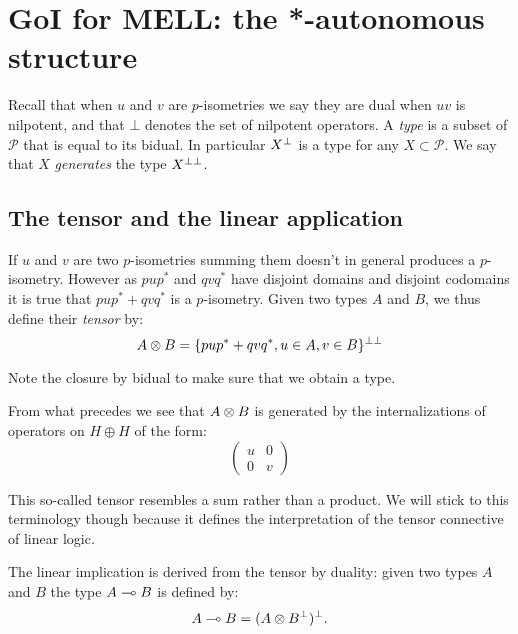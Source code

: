 \section{GoI for MELL: the *-autonomous structure}\label{goi-for-mell-the--autonomous-structure}

Recall that when \(u\) and \(v\) are \(p\)-isometries we say they are
dual when \(uv\) is nilpotent, and that \(\bot\) denotes the set of
nilpotent operators. A \emph{type} is a subset of \(\mathcal{P}\) that
is equal to its bidual. In particular \(X^\bot\) is a type for any
\(X\subset\mathcal{P}\). We say that \(X\) \emph{generates} the type
\(X^{\bot\bot}\).

\subsection{The tensor and the linear application}\label{the-tensor-and-the-linear-application}

If \(u\) and \(v\) are two \(p\)-isometries summing them doesn't in
general produces a \(p\)-isometry. However as \(pup^*\) and \(qvq^*\)
have disjoint domains and disjoint codomains it is true that
\(pup^* + qvq^*\) is a \(p\)-isometry. Given two types \(A\) and \(B\),
we thus define their \emph{tensor} by:
\begin{equation*}
A\otimes B = \{pup^* + qvq^*, u\in A, v\in B\}^{\bot\bot}
\end{equation*}

Note the closure by bidual to make sure that we obtain a type.

From what precedes we see that \(A\otimes B\) is generated by the
internalizations of operators on \(H\oplus H\) of the form:
\begin{equation*}
\begin{pmatrix}
  u & 0 \\
  0 & v
\end{pmatrix}
\end{equation*}

\begin{remark}
This so-called tensor resembles a sum rather than a product. We will stick to this terminology though because it defines the interpretation of the tensor connective of linear logic.
\end{remark}

The linear implication is derived from the tensor by duality: given two
types \(A\) and \(B\) the type \(A\multimap B\) is defined by:
\begin{equation*}
A\multimap B = (A\otimes B^\bot)^\bot.
\end{equation*}

